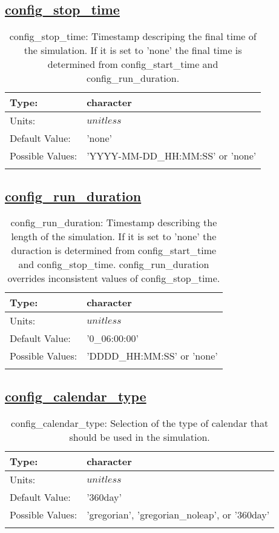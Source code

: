 \subsection[config\_stop\_time]{\hyperref[sec:nm_tab_time_management]{config\_stop\_time}}
\label{subsec:nm_sec_config_stop_time}
\begin{center}
\begin{longtable}{| p{2.0in} | p{4.0in} |}
    \hline
    Type: & character \\
    \hline
    Units: & $unitless$ \\
    \hline
    Default Value: & 'none' \\
    \hline
    Possible Values: & 'YYYY-MM-DD\_HH:MM:SS' or 'none' \\
    \hline
    \caption{config\_stop\_time: Timestamp descriping the final time of the simulation. If it is set to 'none' the final time is determined from config\_start\_time and config\_run\_duration.}
\end{longtable}
\end{center}
\subsection[config\_run\_duration]{\hyperref[sec:nm_tab_time_management]{config\_run\_duration}}
\label{subsec:nm_sec_config_run_duration}
\begin{center}
\begin{longtable}{| p{2.0in} | p{4.0in} |}
    \hline
    Type: & character \\
    \hline
    Units: & $unitless$ \\
    \hline
    Default Value: & '0\_06:00:00' \\
    \hline
    Possible Values: & 'DDDD\_HH:MM:SS' or 'none' \\
    \hline
    \caption{config\_run\_duration: Timestamp describing the length of the simulation. If it is set to 'none' the duraction is determined from config\_start\_time and config\_stop\_time. config\_run\_duration overrides inconsistent values of config\_stop\_time.}
\end{longtable}
\end{center}
\subsection[config\_calendar\_type]{\hyperref[sec:nm_tab_time_management]{config\_calendar\_type}}
\label{subsec:nm_sec_config_calendar_type}
\begin{center}
\begin{longtable}{| p{2.0in} | p{4.0in} |}
    \hline
    Type: & character \\
    \hline
    Units: & $unitless$ \\
    \hline
    Default Value: & '360day' \\
    \hline
    Possible Values: & 'gregorian', 'gregorian\_noleap', or '360day' \\
    \hline
    \caption{config\_calendar\_type: Selection of the type of calendar that should be used in the simulation.}
\end{longtable}
\end{center}
